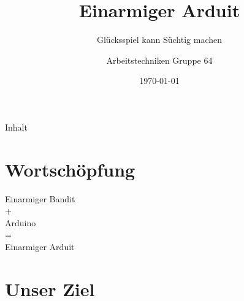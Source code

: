 \documentclass[mathserif,9pt]{article}
\title[Einarmiger Arduit]{Einarmiger Arduit}
\subtitle{Glücksspiel kann Süchtig machen}
\author{Arbeitstechniken Gruppe 64}
\institute{Franziska Massmann \; Jonas Nikolić \; Lukas Pensler \; Simon Struck}
\date{\today}
\begin{document}
    \titleframe        %

    \begin{frame}{Inhalt}
        \tableofcontents
    \end{frame}

    \section{Wortschöpfung}
    \begin{frame}{}
        \begin{block}{}
            \centering
            \Huge{
            Einarmiger Bandit \\
            + \\
            Arduino \\
            = \\
            Einarmiger Arduit}
        \end{block}
    \end{frame}

    \section{Unser Ziel}
    
\end{document}
